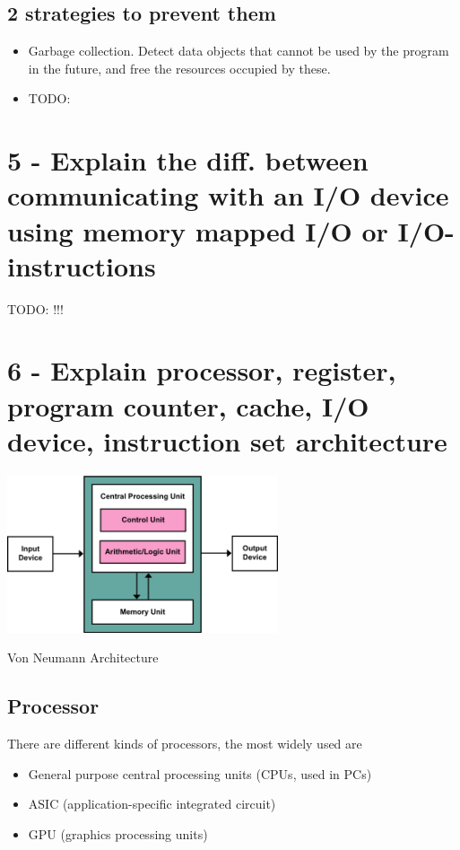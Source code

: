 \documentclass{article}
\begin{document}
\subsection*{2 strategies to prevent them}
\begin{itemize}
	\item Garbage collection. Detect data objects that cannot be used by the program in the future, and free the resources occupied by these.
	\item TODO:
\end{itemize}


\section*{5 - Explain the diff. between communicating with an I/O device using memory mapped I/O or I/O-instructions}
TODO: !!! 

\section*{6 - Explain processor, register, program counter, cache, I/O device, instruction set architecture}

\begin{center}
\includegraphics[width=8.0cm]{images/330px-Von_Neumann_Architecture.png}

Von Neumann Architecture
\end{center}


\subsection*{Processor}
There are different kinds of processors, the most widely used are
\begin{itemize}
	\item General purpose central processing units (CPUs, used in PCs)
	\item ASIC (application-specific integrated circuit)
	\item GPU (graphics processing units)
\end{itemize}
\end{document}

